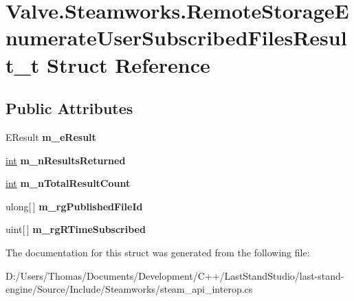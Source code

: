 \hypertarget{structValve_1_1Steamworks_1_1RemoteStorageEnumerateUserSubscribedFilesResult__t}{}\section{Valve.\+Steamworks.\+Remote\+Storage\+Enumerate\+User\+Subscribed\+Files\+Result\+\_\+t Struct Reference}
\label{structValve_1_1Steamworks_1_1RemoteStorageEnumerateUserSubscribedFilesResult__t}
\subsection*{Public Attributes}
\begin{DoxyCompactItemize}
\item 
\hypertarget{structValve_1_1Steamworks_1_1RemoteStorageEnumerateUserSubscribedFilesResult__t_a112956a9bc961456e00056d1cb2f0698}{}E\+Result {\bfseries m\+\_\+e\+Result}\label{structValve_1_1Steamworks_1_1RemoteStorageEnumerateUserSubscribedFilesResult__t_a112956a9bc961456e00056d1cb2f0698}

\item 
\hypertarget{structValve_1_1Steamworks_1_1RemoteStorageEnumerateUserSubscribedFilesResult__t_a7f7f2543968b81a0720e436354cd528e}{}\hyperlink{SDL__thread_8h_a6a64f9be4433e4de6e2f2f548cf3c08e}{int} {\bfseries m\+\_\+n\+Results\+Returned}\label{structValve_1_1Steamworks_1_1RemoteStorageEnumerateUserSubscribedFilesResult__t_a7f7f2543968b81a0720e436354cd528e}

\item 
\hypertarget{structValve_1_1Steamworks_1_1RemoteStorageEnumerateUserSubscribedFilesResult__t_a7939af5b6225fcde4ef9f83a62cf80ff}{}\hyperlink{SDL__thread_8h_a6a64f9be4433e4de6e2f2f548cf3c08e}{int} {\bfseries m\+\_\+n\+Total\+Result\+Count}\label{structValve_1_1Steamworks_1_1RemoteStorageEnumerateUserSubscribedFilesResult__t_a7939af5b6225fcde4ef9f83a62cf80ff}

\item 
\hypertarget{structValve_1_1Steamworks_1_1RemoteStorageEnumerateUserSubscribedFilesResult__t_a7d720bff05f4669cf07dec5e242454a3}{}ulong\mbox{[}$\,$\mbox{]} {\bfseries m\+\_\+rg\+Published\+File\+Id}\label{structValve_1_1Steamworks_1_1RemoteStorageEnumerateUserSubscribedFilesResult__t_a7d720bff05f4669cf07dec5e242454a3}

\item 
\hypertarget{structValve_1_1Steamworks_1_1RemoteStorageEnumerateUserSubscribedFilesResult__t_a07bb4d6ea2e7bab293a3ead5b696bde0}{}uint\mbox{[}$\,$\mbox{]} {\bfseries m\+\_\+rg\+R\+Time\+Subscribed}\label{structValve_1_1Steamworks_1_1RemoteStorageEnumerateUserSubscribedFilesResult__t_a07bb4d6ea2e7bab293a3ead5b696bde0}

\end{DoxyCompactItemize}


The documentation for this struct was generated from the following file\+:\begin{DoxyCompactItemize}
\item 
D\+:/\+Users/\+Thomas/\+Documents/\+Development/\+C++/\+Last\+Stand\+Studio/last-\/stand-\/engine/\+Source/\+Include/\+Steamworks/steam\+\_\+api\+\_\+interop.\+cs\end{DoxyCompactItemize}
